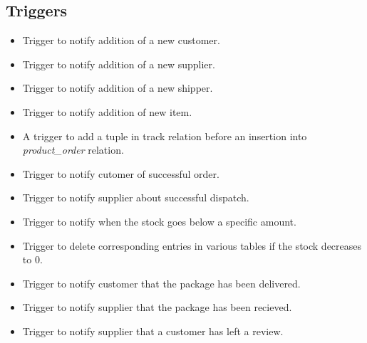 \documentclass[a4paper,12pt]{article} %
\begin{document}
\subsection{Triggers}

\begin{itemize}
    \item Trigger to notify addition of a new customer.
    \item Trigger to notify addition of a new supplier.
    \item Trigger to notify addition of a new shipper.
    \item Trigger to notify addition of new item.
    \item A trigger to add a tuple in track relation before an insertion into \textit{product\_order} relation.
    \item Trigger to notify cutomer of successful order.
    \item Trigger to notify supplier about successful dispatch.
    \item Trigger to notify when the stock goes below a specific amount.
    \item Trigger to delete corresponding entries in various tables if the stock decreases to 0.
    \item Trigger to notify customer that the package has been delivered.
    \item Trigger to notify supplier that the package has been recieved.
    \item Trigger to notify supplier that a customer has left a review.
\end{itemize}

\newpage
\end{document}
